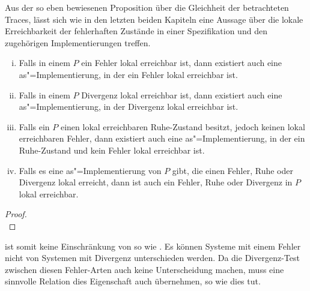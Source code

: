 Aus der so eben bewiesenen Proposition über die Gleichheit der betrachteten
Traces, lässt sich wie in den letzten beiden Kapiteln eine Aussage über die
lokale Erreichbarkeit der \glqq fehlerhaften Zustände\grqq{} in einer
Spezifikation und den zugehörigen Implementierungen treffen.

\begin{Kor}
  \begin{enumerate}[(i)]
    \item Falls in einem \MEIO{} $P$ ein Fehler lokal erreichbar ist, dann
      existiert auch eine as"=Implementierung, in der ein Fehler lokal
      erreichbar ist.
    \item Falls in einem \MEIO{} $P$ Divergenz lokal erreichbar ist, dann
      existiert auch eine as"=Implementierung, in der Divergenz lokal erreichbar
      ist.
    \item Falls ein \MEIO{} $P$ einen lokal erreichbaren Ruhe-Zustand besitzt,
      jedoch keinen lokal erreichbaren Fehler, dann existiert auch eine
      as"=Implementierung, in der ein Ruhe-Zustand und kein Fehler lokal
      erreichbar ist.
    \item Falls es eine as"=Implementierung von $P$ gibt, die einen Fehler,
      Ruhe oder Divergenz lokal erreicht, dann ist auch ein Fehler, Ruhe oder
      Divergenz in $P$ lokal erreichbar.
  \end{enumerate}
\end{Kor}
\begin{proof}\mbox{}\\
\end{proof}

\DRel{} ist somit keine Einschränkung von \ERel{} so wie \QRel{}. Es können
Systeme mit einem Fehler nicht von Systemen mit Divergenz
unterschieden werden. Da die Divergenz-Test zwischen diesen Fehler-Arten auch
keine Unterscheidung machen, muss eine sinnvolle Relation dies Eigenschaft auch
übernehmen, so wie \DRel{} dies tut.


